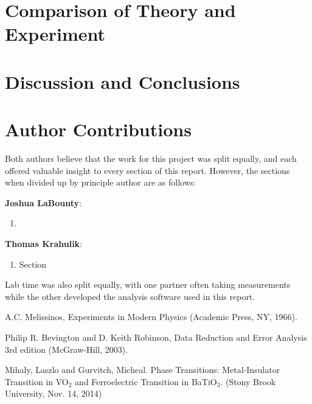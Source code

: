 \documentclass[%
 reprint,
 amsmath,amssymb,
 aps,
 pra,
]{revtex4-1}
\begin{document}
\section{Comparison of Theory and Experiment}

\section{Discussion and Conclusions}

\section{Author Contributions}

Both authors believe that the work for this project was split equally, and each offered valuable insight to every section of this report. However, the sections when divided up by principle author are as follows:

\noindent \textbf{Joshua LaBounty}:
\begin{enumerate}
	\item 
\end{enumerate}

\noindent \textbf{Thomas Krahulik}:
\begin{enumerate}
	\item Section 
\end{enumerate}

\noindent Lab time was also split equally, with one partner often taking measurements while the other developed the analysis software used in this report.

\begin{thebibliography}{6}
	
	A.C. Melissinos, Experiments in Modern Physics (Academic Press, NY, 1966).
	
	Philip R. Bevington and D. Keith Robinson, Data Reduction and Error Analysis 3rd edition (McGraw-Hill, 2003).
	
	Mihaly, Laszlo and Gurvitch, Micheal. Phase Transitions: Metal-Insulator Transition in VO$_2$ and Ferroelectric Transition in BaTiO$_3$. (Stony Brook University, Nov. 14, 2014)

\end{thebibliography}
\end{document}
